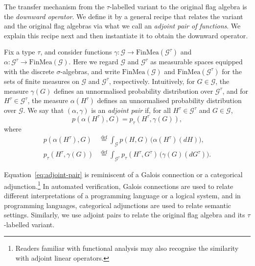 \documentclass{article}
\newcommand*{\defeq}{\stackrel{\mathrm{def}}{=}}
\newcommand*{\FinMea}{\mathrm{FinMea}}
\begin{document}
The transfer mechanism from the $\tau$-labelled variant to the original flag algebra is the \emph{downward operator}. We define it by a general recipe that relates the variant and the original flag algebras via what we call an \emph{adjoint pair of functions}. We explain this recipe next and then instantiate it to obtain the downward operator.

Fix a type $\tau$, and consider functions $\gamma : \mathcal{G} \to \FinMea(\mathcal{G}^\tau)$ and $\alpha : \mathcal{G}^\tau \to \FinMea(\mathcal{G})$.
Here we regard $\mathcal{G}$ and $\mathcal{G}^\tau$ as measurable spaces equipped with the discrete $\sigma$-algebras, and write $\FinMea(\mathcal{G})$ and $\FinMea(\mathcal{G}^\tau)$ for the sets of finite measures on $\mathcal{G}$ and $\mathcal{G}^\tau$, respectively.
Intuitively, for $G \in \mathcal{G}$, the measure $\gamma(G)$ defines an unnormalised probability distribution over $\mathcal{G}^\tau$, and for $H^\tau \in \mathcal{G}^\tau$, the measure $\alpha(H^\tau)$ defines an unnormalised probability distribution over $\mathcal{G}$.
We say that $(\alpha,\gamma)$ is an \emph{adjoint pair} if, for all $H^\tau \in \mathcal{G}^\tau$ and $G \in \mathcal{G}$,
\begin{equation}
\label{eq:adjoint-pair}
p(\alpha(H^\tau), G) = p_\tau(H^\tau, \gamma(G)),
\end{equation}
where
\begin{align*}
  p(\alpha(H^\tau), G) &\defeq \int_{\mathcal{G}} p(H, G) \, \Big(\alpha(H^\tau)(dH)\Big),
  \\
  p_\tau(H^\tau, \gamma(G)) &\defeq \int_{\mathcal{G}^\tau} p_\tau(H^\tau, G^\tau) \, \Big(\gamma(G)(dG^\tau)\Big).
\end{align*}

Equation~\eqref{eq:adjoint-pair} is reminiscent of a Galois connection or a categorical adjunction.\footnote{Readers familiar with functional analysis may also recognise the similarity with adjoint linear operators.}
In automated verification, Galois connections are used to relate different interpretations of a programming language or a logical system, and in programming languages, categorical adjunctions are used to relate semantic settings.
Similarly, we use adjoint pairs to relate the original flag algebra and its $\tau$-labelled variant.
\end{document}
